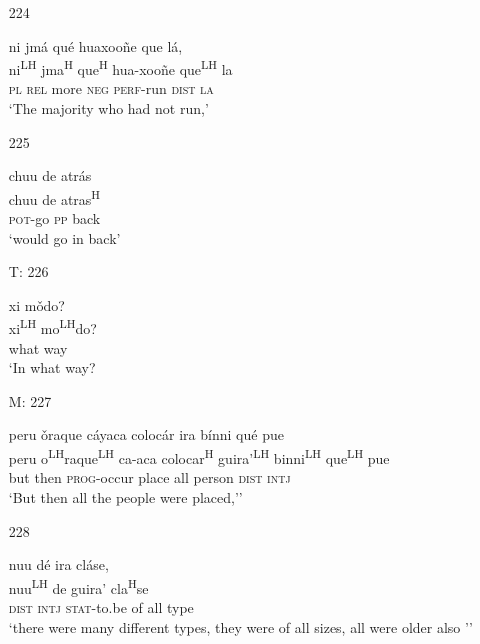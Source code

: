 \begin{itemize}
\item[224]
 
\glll  ni jm\'{a} qu\'{e} huaxoo\~{n}e que l\'{a},  \\
ni\textsuperscript{LH} jma\textsuperscript{H} que\textsuperscript{H} hua-xoo\~{n}e que\textsuperscript{LH} la \\
\textsc{pl} \textsc{rel} more \textsc{neg}  \textsc{perf}-run \textsc{dist} \textsc{la} \\
\glt `The majority who had not run,'
 


\item[225]
 
\glll   chuu de atr\'{a}s \\
chuu de atras\textsuperscript{H} \\
  \textsc{pot}-go \textsc{pp} back \\
\glt `would go in back'
 


\item[T: 226]
 
\glll   xi m\v{o}do? \\
xi\textsuperscript{LH} mo\textsuperscript{LH}do? \\
what way \\
\glt `In what way?
 


\item[M: 227]
 
\glll   peru \v{o}raque c\'{a}yaca coloc\'{a}r ira b\'{i}nni qu\'{e} pue \\
 peru o\textsuperscript{LH}raque\textsuperscript{LH} ca-aca colocar\textsuperscript{H} guira'\textsuperscript{LH} binni\textsuperscript{LH}  que\textsuperscript{LH} pue \\
 but then \textsc{prog}-occur place all person \textsc{dist} \textsc{intj}  \\
\glt `But then all the people were placed,''
 



\item[228]
 
\glll   nuu d\'{e} ira cl\'{a}se,  \\
nuu\textsuperscript{LH} de guira' cla\textsuperscript{H}se \\
\textsc{dist} \textsc{intj} \textsc{stat}-to.be of all type \\
\glt `there were many different types, they were of all sizes, all were older also ''
 




\end{itemize}
